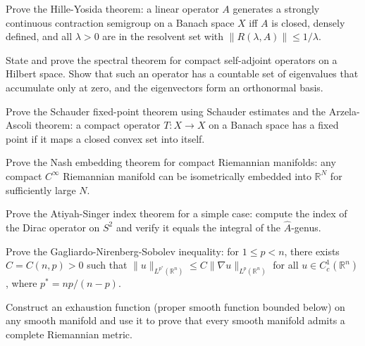 \documentclass[12pt,a4paper]{exam}
\begin{document}
\begin{questions}

\question[5]
Prove the Hille-Yosida theorem: a linear operator $A$ generates a strongly continuous contraction semigroup on a Banach space $X$ iff $A$ is closed, densely defined, and all $\lambda > 0$ are in the resolvent set with $\|R(\lambda,A)\| \leq 1/\lambda$.

\vspace{0.3cm}

\question[3]
State and prove the spectral theorem for compact self-adjoint operators on a Hilbert space. Show that such an operator has a countable set of eigenvalues that accumulate only at zero, and the eigenvectors form an orthonormal basis.

\vspace{0.3cm}

\question[6]
Prove the Schauder fixed-point theorem using Schauder estimates and the Arzela-Ascoli theorem: a compact operator $T: X \to X$ on a Banach space has a fixed point if it maps a closed convex set into itself.

\vspace{0.3cm}

\question[4]
Prove the Nash embedding theorem for compact Riemannian manifolds: any compact $C^\infty$ Riemannian manifold can be isometrically embedded into $\mathbb{R}^N$ for sufficiently large $N$.

\vspace{0.3cm}

\question[5]
Prove the Atiyah-Singer index theorem for a simple case: compute the index of the Dirac operator on $S^2$ and verify it equals the integral of the $\widehat{A}$-genus.

\vspace{0.3cm}

\question[3]
Prove the Gagliardo-Nirenberg-Sobolev inequality: for $1 \leq p < n$, there exists $C = C(n,p) > 0$ such that $\|u\|_{L^{p^*}(\mathbb{R}^n)} \leq C \|\nabla u\|_{L^p(\mathbb{R}^n)}$ for all $u \in C_c^1(\mathbb{R}^n)$, where $p^* = np/(n-p)$.

\vspace{0.3cm}

\question[4]
Construct an exhaustion function (proper smooth function bounded below) on any smooth manifold and use it to prove that every smooth manifold admits a complete Riemannian metric.

\vspace{0.3cm}


\end{questions}
\end{document}
